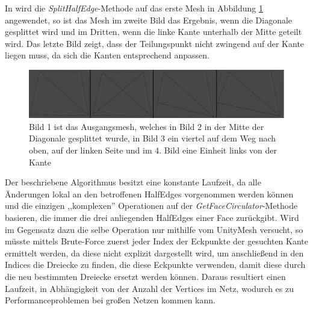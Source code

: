 In wird die \textit{SplitHalfEdge}-Methode auf das erste Mesh in Abbildung \ref{fig:meshmash} angewendet, so ist das Mesh im zweite Bild das Ergebnis, wenn die Diagonale gesplittet wird und im Dritten, wenn die linke Kante unterhalb der Mitte geteilt wird. Das letzte Bild zeigt, dass der Teilungspunkt nicht zwingend auf der Kante liegen muss, da sich die Kanten entsprechend anpassen.
\begin{figure}[H]
	\centering
	\includegraphics[width=1 \linewidth]{Images/meshmash}
	\caption{Bild 1 ist das Ausgangsmesh, welches in Bild 2 in der Mitte der Diagonale gesplittet wurde, in Bild 3 ein viertel auf dem Weg nach oben, auf der linken Seite und im 4. Bild eine Einheit links von der Kante}
	\label{fig:meshmash}
\end{figure}

Der beschriebene Algorithmus besitzt eine konstante Laufzeit, da alle \"Anderungen lokal an den betroffenen HalfEdges vorgenommen werden k\"onnen und die einzigen ,,komplexen'' Operationen auf der \textit{GetFaceCirculator}-Methode basieren, die immer die drei anliegenden HalfEdges einer Face zur\"uckgibt. Wird im Gegensatz dazu die selbe Operation nur mithilfe vom UnityMesh versucht, so m\"usste mittels Brute-Force zuerst jeder Index der Eckpunkte der gesuchten Kante ermittelt werden, da diese nicht explizit dargestellt wird, um anschlie{\ss}end in den Indices die Dreiecke zu finden, die diese Eckpunkte verwenden, damit diese durch die neu bestimmten Dreiecke ersetzt werden k\"onnen. Daraus resultiert einen Laufzeit, in Abh\"angigkeit von der Anzahl der Vertices im Netz, wodurch es zu Performanceproblemen bei gro{\ss}en Netzen kommen kann.

